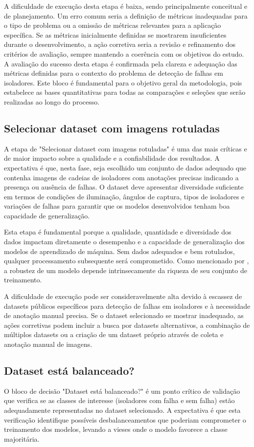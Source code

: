 A dificuldade de execução desta etapa é baixa, sendo principalmente conceitual e de planejamento. Um erro comum seria a definição de métricas inadequadas para o tipo de problema ou a omissão de métricas relevantes para a aplicação específica. Se as métricas inicialmente definidas se mostrarem insuficientes durante o desenvolvimento, a ação corretiva seria a revisão e refinamento dos critérios de avaliação, sempre mantendo a coerência com os objetivos do estudo. A avaliação do sucesso desta etapa é confirmada pela clareza e adequação das métricas definidas para o contexto do problema de detecção de falhas em isoladores. Este bloco é fundamental para o objetivo geral da metodologia, pois estabelece as bases quantitativas para todas as comparações e seleções que serão realizadas ao longo do processo.

\subsection{Selecionar dataset com imagens rotuladas}
A etapa de "Selecionar dataset com imagens rotuladas" é uma das mais críticas e de maior impacto sobre a qualidade e a confiabilidade dos resultados. A expectativa é que, nesta fase, seja escolhido um conjunto de dados adequado que contenha imagens de cadeias de isoladores com anotações precisas indicando a presença ou ausência de falhas. O dataset deve apresentar diversidade suficiente em termos de condições de iluminação, ângulos de captura, tipos de isoladores e variações de falhas para garantir que os modelos desenvolvidos tenham boa capacidade de generalização.

Esta etapa é fundamental porque a qualidade, quantidade e diversidade dos dados impactam diretamente o desempenho e a capacidade de generalização dos modelos de aprendizado de máquina. Sem dados adequados e bem rotulados, qualquer processamento subsequente será comprometido. Como mencionado por , a robustez de um modelo depende intrinsecamente da riqueza de seu conjunto de treinamento.

A dificuldade de execução pode ser consideravelmente alta devido à escassez de datasets públicos específicos para detecção de falhas em isoladores e à necessidade de anotação manual precisa. Se o dataset selecionado se mostrar inadequado, as ações corretivas podem incluir a busca por datasets alternativos, a combinação de múltiplos datasets ou a criação de um dataset próprio através de coleta e anotação manual de imagens.

\subsection{Dataset está balanceado?}
O bloco de decisão "Dataset está balanceado?" é um ponto crítico de validação que verifica se as classes de interesse (isoladores com falha e sem falha) estão adequadamente representadas no dataset selecionado. A expectativa é que esta verificação identifique possíveis desbalanceamentos que poderiam comprometer o treinamento dos modelos, levando a vieses onde o modelo favorece a classe majoritária.

